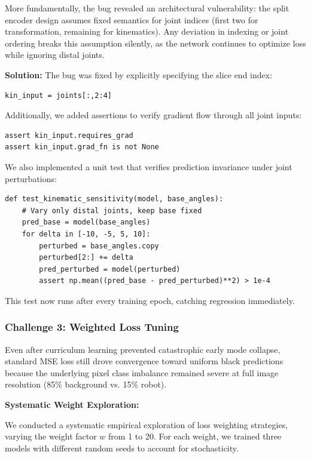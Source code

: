 ﻿\documentclass[12pt,a4paper,oneside]{report}
\begin{document}
More fundamentally, the bug revealed an architectural vulnerability: the split encoder design assumes fixed semantics for joint indices (first two for transformation, remaining for kinematics). Any deviation in indexing or joint ordering breaks this assumption silently, as the network continues to optimize loss while ignoring distal joints.

\textbf{Solution:} The bug was fixed by explicitly specifying the slice end index:
\begin{verbatim}
kin_input = joints[:,2:4]
\end{verbatim}

Additionally, we added assertions to verify gradient flow through all joint inputs:
\begin{verbatim}
assert kin_input.requires_grad
assert kin_input.grad_fn is not None
\end{verbatim}

We also implemented a unit test that verifies prediction invariance under joint perturbations:

\begin{verbatim}
def test_kinematic_sensitivity(model, base_angles):
    # Vary only distal joints, keep base fixed
    pred_base = model(base_angles)
    for delta in [-10, -5, 5, 10]:
        perturbed = base_angles.copy
        perturbed[2:] += delta
        pred_perturbed = model(perturbed)
        assert np.mean((pred_base - pred_perturbed)**2) > 1e-4
\end{verbatim}

This test now runs after every training epoch, catching regression immediately.

\subsubsection{Challenge 3: Weighted Loss Tuning}

Even after curriculum learning prevented catastrophic early mode collapse, standard MSE loss still drove convergence toward uniform black predictions because the underlying pixel class imbalance remained severe at full image resolution (85\% background vs. 15\% robot).

\textbf{Systematic Weight Exploration:}

We conducted a systematic empirical exploration of loss weighting strategies, varying the weight factor $w$ from 1 to 20. For each weight, we trained three models with different random seeds to account for stochasticity.
\end{document}
